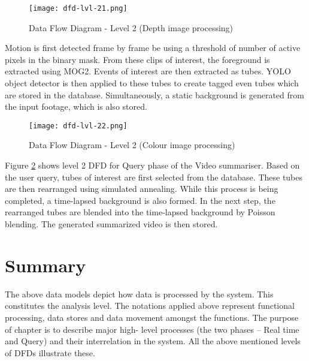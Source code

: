    \begin{figure}[H]
        \centering
        \texttt{[image: dfd-lvl-21.png]}
        \caption {Data Flow Diagram - Level 2 (Depth image processing)}
        \label{img:dfd-lvl-21}
    \end{figure}

    Motion is first detected frame by frame be using a threshold of number of
    active pixels in the binary mask. From these clips of interest, the
    foreground is extracted using MOG2. Events of interest are then extracted
    as tubes. YOLO object detector is then applied to these tubes to create
    tagged even tubes which are stored in the database. Simultaneously, a
    static background is generated from the input footage, which is also stored.

    \begin{figure}[H]
        \centering
        \texttt{[image: dfd-lvl-22.png]}
        \caption {Data Flow Diagram - Level 2 (Colour image processing)}
        \label{img:dfd-lvl-22}
    \end{figure}

    Figure \ref{img:dfd-lvl-22} shows level 2 DFD for Query phase of the Video
    summariser. Based on the user query, tubes of interest are first selected
    from the database. These tubes are then rearranged using simulated
    annealing. While this process is being completed, a time-lapsed background
    is also formed. In the next step, the rearranged tubes are blended into the
    time-lapsed background by Poisson blending. The generated summarized video
    is then stored.

\section{Summary}
The above data models depict how data is processed by the system. This
constitutes the analysis level. The notations applied above represent
functional processing, data stores and data movement amongst the functions. The
purpose of chapter is to describe major high- level processes (the two phases –
Real time and Query) and their interrelation in the system. All the above
mentioned levels of DFDs illustrate these.